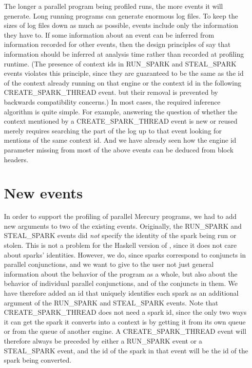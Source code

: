 \noindent
The longer a parallel program being profiled runs,
the more events it will generate.
Long running programs can generate enormous log files.
To keep the sizes of log files down as much as possible,
events include only the information they have to.
If some information about an event
can be inferred from information recorded for other events,
then the design principles of \tscope say
that information should be inferred at analysis time
rather than recorded at profiling runtime.
(The presence of context ids in RUN\_SPARK and STEAL\_SPARK events
violates this principle,
since they are guaranteed to be the same as the id of the context already
running on that engine or
the context id in the following CREATE\_SPARK\_THREAD event.
but their removal is prevented by backwards compatibility concerns.)
In most cases, the required inference algorithm is quite simple.
For example, answering the question of whether the context
mentioned by a CREATE\_SPARK\_THREAD event is new or reused
merely requires searching the part of the log up to that event
looking for mentions of the same context id.
And we have already seen how the engine id parameter
missing from most of the above events
can be deduced from block headers.

\section{New events}
\label{sec:newevents}

In order to support the profiling of parallel Mercury programs,
we had to add new arguments to two of the existing \tscope events.
Originally, the RUN\_SPARK and STEAL\_SPARK events
did \emph{not} specify the identity of the spark being run or stolen.
This is not a problem for the Haskell version of \tscope,
since it does not care about sparks' identities.
However, we do, since sparks correspond to conjuncts in parallel conjunctions,
and we want to give to the user not just general information
about the behavior of the program as a whole,
but also about the behavior of individual parallel conjunctions,
and of the conjuncts in them.
We have therefore added an id that uniquely identifies each spark
as an additional argument of the RUN\_SPARK and STEAL\_SPARK events.
Note that CREATE\_SPARK\_THREAD does not need a spark id,
since the only two ways it can get the spark it converts into a context
is by getting it from its own queue or from the queue of another engine.
A CREATE\_SPARK\_THREAD event will therefore always be preceded
by either a RUN\_SPARK event or a STEAL\_SPARK event,
and the id of the spark in that event
will be the id of the spark being converted.

